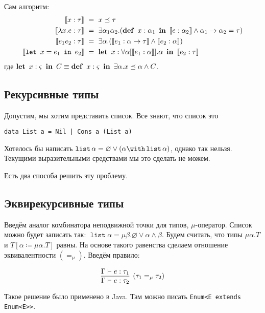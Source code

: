 Сам алгоритм:
\begin{align*}
    \restr{x : \tau} \ &=\  x \preceq \tau \\
    \restr{\lambda x . e : \tau} \ &=\ 
        \exists \alpha_1 \alpha_2 . (\deff{x : \alpha_1}{\restr{e:\alpha_2}} \land \alpha_1\to\alpha_2=\tau) \\
    \restr{e_1 e_2 : \tau} \ &=\ 
        \exists\alpha.(\restr{e_1 :\alpha\to\tau} \land \restr{e_2 : \alpha}) \\
    \restr{\lett{x = e_1}{e_2}} \ &=\ \deflet{x : \forall \alpha[\restr{e_1 : \alpha}].\alpha}
        {\restr{e_2:\tau}}
\end{align*}
где $\mathinner{\mathbf{let}}~x : \varsigma~\mathinner{\mathbf{in}}~C \equiv \mathinner\mathbf{def}~x : \varsigma~\mathinner\mathbf{in}~\exists \alpha . x \preceq \alpha \land C$.
\\ \todo

\subsection{\texorpdfstring{Рекурсивные типы}{Recursive types}}
Допустим, мы хотим представить список. Все знают, что список это
\begin{verbatim}
data List a = Nil | Cons a (List a)
\end{verbatim}
Хотелось бы написать $\operatorname{\mathtt{list}}\alpha=\varnothing\lor(\alpha\with\operatorname{\mathtt{list}}\alpha)$,
однако так нельзя.
Текущими выразительными средствами мы это сделать не можем.

Есть два способа решить эту проблему.

\subsection*{\texorpdfstring{Эквирекурсивные типы}{Equirecursive types}}
Введём аналог комбинатора неподвижной точки для типов, $\mu$-оператор.
Список можно будет записать так: $\operatorname{\mathtt{list}} \alpha = \mu \beta . \varnothing \lor \alpha \land \beta$.
Будем считать, что типы $\mu \alpha . T$ и $T[\alpha \coloneqq \mu \alpha.T]$ равны.
На основе такого равенства сделаем отношение эквивалентности $(=_\mu)$.
Введём правило:
\begin{bnf}
\[
    \infer[(\tau_1=_\mu \tau_2)]
        {\Gamma \vdash e : \tau_2}
        {\Gamma \vdash e : \tau_1}
\]%
\end{bnf}%

Такое решение было применено в Java. Там можно писать \texttt{Enum<E extends Enum<E>>}.

